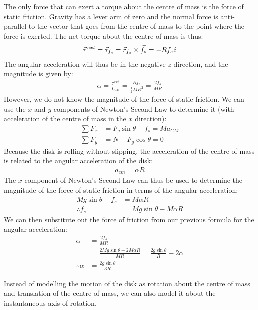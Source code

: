 \begin{example}
The only force that can exert a torque about the centre of mass is the force of static friction. Gravity has a lever arm of zero and the normal force is anti-parallel to the vector that goes from the centre of mass to the point where the force is exerted. The net torque about the centre of mass is thus:
\begin{align*}
\pvec\tau^{ext} = \vec \tau_{f_s} = \vec r_{f_s}\times \vec f_s= -Rf_s\hat z
\end{align*}
The angular acceleration will thus be in the negative $z$ direction, and the magnitude is given by:
\begin{align*}
\alpha = \frac{\tau^{ext}}{I_{CM}}=\frac{Rf_s}{\frac{1}{2}MR^2}=\frac{2f_s}{MR}
\end{align*} 
However, we do not know the magnitude of the force of static friction. We can use the $x$ and $y$ components of Newton's Second Law to determine it (with acceleration of the centre of mass in the $x$ direction):
\begin{align*}
\sum F_x &= F_g\sin\theta - f_s = Ma_{CM}\\
\sum F_y &= N - F_g\cos\theta = 0
\end{align*}
Because the disk is rolling without slipping, the acceleration of the centre of mass is related to the angular acceleration of the disk:
\begin{align*}
a_{cm} = \alpha R
\end{align*}
The $x$ component of Newton's Second Law can thus be used to determine the magnitude of the force of static friction in terms of the angular acceleration:
\begin{align*}
Mg\sin\theta - f_s &= M \alpha R\\
\therefore f_s &= Mg\sin\theta - M\alpha R
\end{align*}
We can then substitute out the force of friction from our previous formula for the angular acceleration:
\begin{align*}
\alpha &= \frac{2f_s}{MR}\\
&=\frac{2Mg\sin\theta - 2M\alpha R}{MR} = \frac{2g\sin\theta}{R} - 2\alpha \\
\therefore \alpha &= \frac{2g\sin\theta}{3R}
\end{align*}

Instead of modelling the motion of the disk  as rotation about the centre of mass and translation of the centre of mass, we can also model it about the instantaneous axis of rotation.


\end{example}
